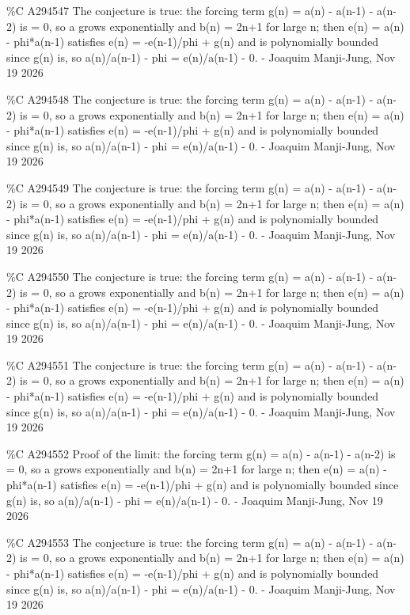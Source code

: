 {\%C A294547 The conjecture is true: the forcing term g(n) = a(n) - a(n-1) - a(n-2) is = 0, so a grows exponentially and b(n) = 2n+1 for large n; then e(n) = a(n) - phi*a(n-1) satisfies e(n) = -e(n-1)/phi + g(n) and is polynomially bounded since g(n) is, so a(n)/a(n-1) - phi = e(n)/a(n-1) - 0. - Joaquim Manji-Jung, Nov 19 2026\par
\%C A294548 The conjecture is true: the forcing term g(n) = a(n) - a(n-1) - a(n-2) is = 0, so a grows exponentially and b(n) = 2n+1 for large n; then e(n) = a(n) - phi*a(n-1) satisfies e(n) = -e(n-1)/phi + g(n) and is polynomially bounded since g(n) is, so a(n)/a(n-1) - phi = e(n)/a(n-1) - 0. - Joaquim Manji-Jung, Nov 19 2026\par
\%C A294549 The conjecture is true: the forcing term g(n) = a(n) - a(n-1) - a(n-2) is = 0, so a grows exponentially and b(n) = 2n+1 for large n; then e(n) = a(n) - phi*a(n-1) satisfies e(n) = -e(n-1)/phi + g(n) and is polynomially bounded since g(n) is, so a(n)/a(n-1) - phi = e(n)/a(n-1) - 0. - Joaquim Manji-Jung, Nov 19 2026\par
\%C A294550 The conjecture is true: the forcing term g(n) = a(n) - a(n-1) - a(n-2) is = 0, so a grows exponentially and b(n) = 2n+1 for large n; then e(n) = a(n) - phi*a(n-1) satisfies e(n) = -e(n-1)/phi + g(n) and is polynomially bounded since g(n) is, so a(n)/a(n-1) - phi = e(n)/a(n-1) - 0. - Joaquim Manji-Jung, Nov 19 2026\par
\%C A294551 The conjecture is true: the forcing term g(n) = a(n) - a(n-1) - a(n-2) is = 0, so a grows exponentially and b(n) = 2n+1 for large n; then e(n) = a(n) - phi*a(n-1) satisfies e(n) = -e(n-1)/phi + g(n) and is polynomially bounded since g(n) is, so a(n)/a(n-1) - phi = e(n)/a(n-1) - 0. - Joaquim Manji-Jung, Nov 19 2026\par
\%C A294552 Proof of the limit: the forcing term g(n) = a(n) - a(n-1) - a(n-2) is = 0, so a grows exponentially and b(n) = 2n+1 for large n; then e(n) = a(n) - phi*a(n-1) satisfies e(n) = -e(n-1)/phi + g(n) and is polynomially bounded since g(n) is, so a(n)/a(n-1) - phi = e(n)/a(n-1) - 0. - Joaquim Manji-Jung, Nov 19 2026\par
\%C A294553 The conjecture is true: the forcing term g(n) = a(n) - a(n-1) - a(n-2) is = 0, so a grows exponentially and b(n) = 2n+1 for large n; then e(n) = a(n) - phi*a(n-1) satisfies e(n) = -e(n-1)/phi + g(n) and is polynomially bounded since g(n) is, so a(n)/a(n-1) - phi = e(n)/a(n-1) - 0. - Joaquim Manji-Jung, Nov 19 2026\par
}
